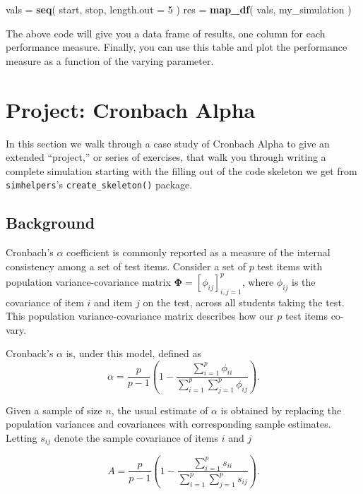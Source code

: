 \documentclass[
]{book}
\newenvironment{Shaded}{\begin{snugshade}}{\end{snugshade}}
\newcommand{\AttributeTok}[1]{\textcolor[rgb]{0.13,0.29,0.53}{#1}}
\newcommand{\DecValTok}[1]{\textcolor[rgb]{0.00,0.00,0.81}{#1}}
\newcommand{\FunctionTok}[1]{\textcolor[rgb]{0.13,0.29,0.53}{\textbf{#1}}}
\newcommand{\NormalTok}[1]{#1}
\newcommand{\OtherTok}[1]{\textcolor[rgb]{0.56,0.35,0.01}{#1}}
\begin{document}
\begin{Shaded}
\begin{Highlighting}[]
\NormalTok{vals }\OtherTok{=} \FunctionTok{seq}\NormalTok{( start, stop, }\AttributeTok{length.out =} \DecValTok{5}\NormalTok{ )}
\NormalTok{res }\OtherTok{=} \FunctionTok{map\_df}\NormalTok{( vals, my\_simulation ) }
\end{Highlighting}
\end{Shaded}

The above code will give you a data frame of results, one column for each performance measure.
Finally, you can use this table and plot the performance measure as a function of the varying parameter.

\chapter{Project: Cronbach Alpha}\label{case_Cronbach}

In this section we walk through a case study of Cronbach Alpha to give an extended ``project,'' or series of exercises, that walk you through writing a complete simulation starting with the filling out of the code skeleton we get from \texttt{simhelpers}'s \texttt{create\_skeleton()} package.

\section{Background}\label{background}

Cronbach's \(\alpha\) coefficient is commonly reported as a measure of the internal consistency among a set of test items. Consider a set of \(p\) test items with population variance-covariance matrix \(\boldsymbol\Phi = \left[\phi_{ij}\right]_{i,j=1}^p\), where \(\phi_{ij}\) is the covariance of item \(i\) and item \(j\) on the test, across all students taking the test.
This population variance-covariance matrix describes how our \(p\) test items co-vary.

Cronback's \(\alpha\) is, under this model, defined as
\[
\alpha = \frac{p}{p - 1}\left(1 - \frac{\sum_{i=1}^p \phi_{ii}}{\sum_{i=1}^p \sum_{j=1}^p \phi_{ij}}\right).
\]

Given a sample of size \(n\), the usual estimate of \(\alpha\) is obtained by replacing the population variances and covariances with corresponding sample estimates. Letting \(s_{ij}\) denote the sample covariance of items \(i\) and \(j\)

\[
A = \frac{p}{p - 1}\left(1 - \frac{\sum_{i=1}^p s_{ii}}{\sum_{i=1}^p \sum_{j=1}^p s_{ij}}\right).
\]
\end{document}
